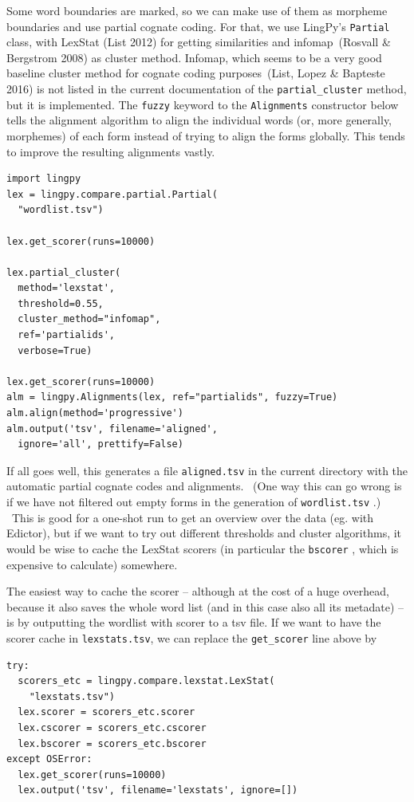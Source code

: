\documentclass[
  a4paper,
  14pt,
  oneside,
  tablecaptionabove
]{scrbook}
\begin{document}
Some word boundaries are marked, so we can make use of them as morpheme
boundaries and use partial cognate coding. For that, we use LingPy's
\lstinline!Partial! class, with LexStat (List 2012) for getting
similarities and infomap~(Rosvall \& Bergstrom 2008) as cluster method.
Infomap, which seems to be a very good baseline cluster method for
cognate coding purposes~(List, Lopez \& Bapteste 2016) is not listed in
the current documentation of the \lstinline!partial_cluster! method, but
it is implemented. The \lstinline!fuzzy! keyword to the
\lstinline!Alignments! constructor below tells the alignment algorithm
to align the individual words (or, more generally, morphemes) of each
form instead of trying to align the forms globally. This tends to
improve the resulting alignments vastly.

\begin{lstlisting}
import lingpy
lex = lingpy.compare.partial.Partial(
  "wordlist.tsv")

lex.get_scorer(runs=10000)

lex.partial_cluster(
  method='lexstat',
  threshold=0.55,
  cluster_method="infomap",
  ref='partialids',
  verbose=True)

lex.get_scorer(runs=10000)
alm = lingpy.Alignments(lex, ref="partialids", fuzzy=True)
alm.align(method='progressive')
alm.output('tsv', filename='aligned',
  ignore='all', prettify=False)
\end{lstlisting}

If all goes well, this generates a file \lstinline!aligned.tsv! in the
current directory with the automatic partial cognate codes and
alignments.~ (One way this can go wrong is if we have not filtered out
empty forms in the generation of \lstinline!wordlist.tsv! .) ~This is
good for a one-shot run to get an overview over the data (eg. with
Edictor), but if we want to try out different thresholds and cluster
algorithms, it would be wise to cache the LexStat scorers (in particular
the \lstinline!bscorer! , which is expensive to calculate) somewhere.

The easiest way to cache the scorer -- although at the cost of a huge
overhead, because it also saves the whole word list (and in this case
also all its metadate) -- is by outputting the wordlist with scorer to a
tsv file. If we want to have the scorer cache in
\lstinline!lexstats.tsv!, we can replace the \lstinline!get_scorer! line
above by

\begin{lstlisting}
try:
  scorers_etc = lingpy.compare.lexstat.LexStat(
    "lexstats.tsv")
  lex.scorer = scorers_etc.scorer
  lex.cscorer = scorers_etc.cscorer
  lex.bscorer = scorers_etc.bscorer
except OSError:
  lex.get_scorer(runs=10000)
  lex.output('tsv', filename='lexstats', ignore=[])
\end{lstlisting}
\end{document}
